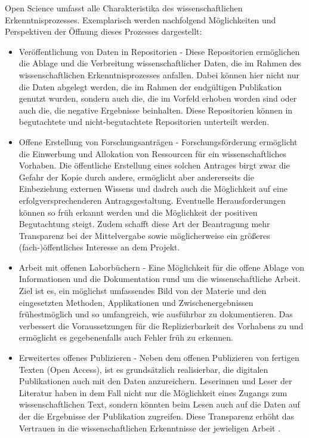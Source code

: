 Open Science umfasst alle Charakteristika des wissenschaftlichen Erkenntnisprozesses. Exemplarisch werden nachfolgend Möglichkeiten und Perspektiven der Öffnung dieses Prozesses dargestellt:
\begin{itemize}
\item Veröffentlichung von Daten in Repositorien - Diese Repositorien ermöglichen die Ablage und die Verbreitung wissenschaftlicher Daten, die im Rahmen des wissenschaftlichen Erkenntnisprozesses anfallen. Dabei können hier nicht nur die Daten abgelegt werden, die im Rahmen der endgültigen Publikation genutzt wurden, sondern auch die, die im Vorfeld erhoben worden sind oder auch die, die negative Ergebnisse beinhalten. Diese Repositorien können in begutachtete und nicht-begutachtete Repositorien unterteilt werden.
\item Offene Erstellung von Forschungsanträgen - Forschungsförderung ermöglicht die Einwerbung und Allokation von Ressourcen für ein wissenschaftliches Vorhaben. Die öffentliche Erstellung eines solchen Antrages birgt zwar die Gefahr der Kopie durch andere, ermöglicht aber andererseits die Einbeziehung externen Wissens und dadrch auch die Möglichkeit auf eine erfolgversprechenderen Antragsgestaltung. Eventuelle Herausforderungen können so früh erkannt werden und die Möglichkeit der positiven Begutachtung steigt. Zudem schafft diese Art der Beantragung mehr Transparenz bei der Mittelvergabe sowie möglicherweise ein größeres (fach-)öffentliches Interesse an dem Projekt.
\item Arbeit mit offenen Laborbüchern - Eine Möglichkeit für die offene Ablage von Informationen und die Dokumentation rund um die wissenschaftliche Arbeit. Ziel ist es, ein möglichst umfassendes Bild von der Materie und den eingesetzten Methoden, Applikationen und Zwischenergebnissen frühestmöglich und so umfangreich, wie ausführbar zu dokumentieren. Das verbessert die Voraussetzungen für die Replizierbarkeit des Vorhabens zu und ermöglicht es gegebenenfalls auch Fehler früh zu erkennen.
\item Erweitertes offenes Publizieren - Neben dem offenen Publizieren von fertigen Texten (Open Access), ist es grundsätzlich realisierbar, die digitalen Publikationen auch mit den Daten anzureichern. Leserinnen und Leser der Literatur haben in dem Fall nicht nur die Möglichkeit eines Zugangs zum wissenschaftlichen Text, sondern könnten beim Lesen auch auf die Daten auf der die Ergebnisse der Publikation zugreifen. Diese Transparenz erhöht das Vertrauen in die wissenschaftlichen Erkenntnisse der jewieligen Arbeit \cite{Nosek_2015}.

\end{itemize}
